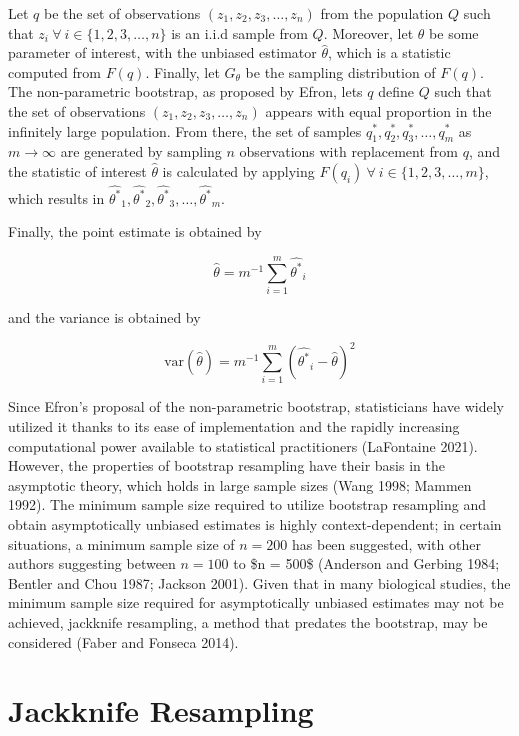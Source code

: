 \documentclass[
  letterpaper,
  DIV=11,
  numbers=noendperiod]{scrreprt}
\begin{document}
Let \(q\) be the set of observations
\(\left(z_1, z_2, z_3, \dots, z_n \right)\) from the population \(Q\)
such that \(z_i \ \forall \ i \in \{1, 2, 3, \dots, n\}\) is an i.i.d
sample from \(Q\). Moreover, let \(\theta\) be some parameter of
interest, with the unbiased estimator \(\hat{\theta}\), which is a
statistic computed from \(F(q)\). Finally, let \(G_{\theta}\) be the
sampling distribution of \(F(q)\). The non-parametric bootstrap, as
proposed by Efron, lets \(q\) define \(Q\) such that the set of
observations \(\left(z_1, z_2, z_3, \dots, z_n \right)\) appears with
equal proportion in the infinitely large population. From there, the set
of samples \(q^*_1, q^*_2, q^*_3, \dots, q^*_m\) as
\(m \rightarrow \infty\) are generated by sampling \(n\) observations
with replacement from \(q\), and the statistic of interest
\(\hat{\theta}\) is calculated by applying
\(F(q_i) \ \forall \ i \in \{1, 2, 3, \dots, m\}\), which results in
\(\hat{\theta^*}_1, \hat{\theta^*}_2, \hat{\theta^*}_3, \dots, \hat{\theta^*}_m\).

Finally, the point estimate is obtained by

\[\hat{\theta} = m^{-1}\sum^m_{i = 1} \hat{\theta^*}_i\]

and the variance is obtained by

\[\text{var}(\hat{\theta}) = m^{-1}\sum^m_{i = 1} \left(\hat{\theta^*}_i - \hat{\theta}\right)^2\]

Since Efron's proposal of the non-parametric bootstrap, statisticians
have widely utilized it thanks to its ease of implementation and the
rapidly increasing computational power available to statistical
practitioners (LaFontaine 2021). However, the properties of bootstrap
resampling have their basis in the asymptotic theory, which holds in
large sample sizes (Wang 1998; Mammen 1992). The minimum sample size
required to utilize bootstrap resampling and obtain asymptotically
unbiased estimates is highly context-dependent; in certain situations, a
minimum sample size of \(n = 200\) has been suggested, with other
authors suggesting between \(n = 100\) to \$n = 500\$ (Anderson and
Gerbing 1984; Bentler and Chou 1987; Jackson 2001). Given that in many
biological studies, the minimum sample size required for asymptotically
unbiased estimates may not be achieved, jackknife resampling, a method
that predates the bootstrap, may be considered (Faber and Fonseca 2014).

\hypertarget{jackknife-resampling}{%
\section{Jackknife Resampling}\label{jackknife-resampling}}
\end{document}
